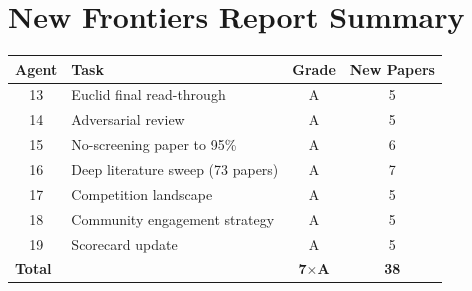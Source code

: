 \documentclass[11pt,a4paper]{article}
\begin{document}
\section*{New Frontiers Report Summary}

\begin{center}
\begin{tabular}{clcc}
\toprule
\textbf{Agent} & \textbf{Task} & \textbf{Grade} & \textbf{New Papers} \\
\midrule
13 & Euclid final read-through & A & 5 \\
14 & Adversarial review & A & 5 \\
15 & No-screening paper to 95\% & A & 6 \\
16 & Deep literature sweep (73 papers) & A & 7 \\
17 & Competition landscape & A & 5 \\
18 & Community engagement strategy & A & 5 \\
19 & Scorecard update & A & 5 \\
\midrule
\multicolumn{2}{l}{\textbf{Total}} & \textbf{7$\times$A} & \textbf{38} \\
\bottomrule
\end{tabular}
\end{center}
\end{document}
